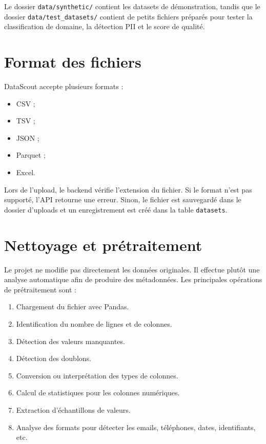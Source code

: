 \documentclass[12pt,a4paper]{report}
\begin{document}
Le dossier \texttt{data/synthetic/} contient les datasets de démonstration, tandis que le dossier \texttt{data/test\_datasets/} contient de petits fichiers préparés pour tester la classification de domaine, la détection PII et le score de qualité.

\section{Format des fichiers}

DataScout accepte plusieurs formats :

\begin{itemize}
    \item CSV ;
    \item TSV ;
    \item JSON ;
    \item Parquet ;
    \item Excel.
\end{itemize}

Lors de l'upload, le backend vérifie l'extension du fichier. Si le format n'est pas supporté, l'API retourne une erreur. Sinon, le fichier est sauvegardé dans le dossier d'uploads et un enregistrement est créé dans la table \texttt{datasets}.

\section{Nettoyage et prétraitement}

Le projet ne modifie pas directement les données originales. Il effectue plutôt une analyse automatique afin de produire des métadonnées. Les principales opérations de prétraitement sont :

\begin{enumerate}
    \item Chargement du fichier avec Pandas.
    \item Identification du nombre de lignes et de colonnes.
    \item Détection des valeurs manquantes.
    \item Détection des doublons.
    \item Conversion ou interprétation des types de colonnes.
    \item Calcul de statistiques pour les colonnes numériques.
    \item Extraction d'échantillons de valeurs.
    \item Analyse des formats pour détecter les emails, téléphones, dates, identifiants, etc.
\end{enumerate}
\end{document}
